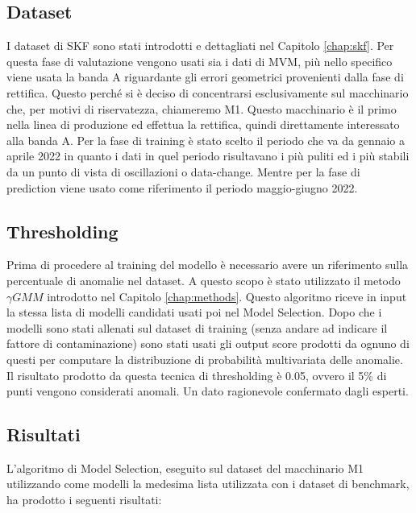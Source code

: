 \subsection{Dataset}
I dataset di SKF sono stati introdotti e dettagliati nel Capitolo \ref{chap:skf}. Per questa fase di valutazione vengono usati sia i dati di MVM, più nello specifico viene usata la banda A riguardante gli errori geometrici provenienti dalla fase di rettifica. Questo perché si è deciso di concentrarsi esclusivamente sul macchinario che, per motivi di riservatezza, chiameremo M1. Questo macchinario è il primo nella linea di produzione ed effettua la rettifica, quindi direttamente interessato alla banda A.
Per la fase di training è stato scelto il periodo che va da gennaio a aprile 2022 in quanto i dati in quel periodo risultavano i più puliti ed i più stabili da un punto di vista di oscillazioni o data-change. Mentre per la fase di prediction viene usato come riferimento il periodo maggio-giugno 2022.



\subsection{Thresholding}
Prima di procedere al training del modello è necessario avere un riferimento sulla percentuale di anomalie nel dataset. A questo scopo è stato utilizzato il metodo ${\gamma}GMM$ introdotto nel Capitolo \ref{chap:methods}.
Questo algoritmo riceve in input la stessa lista di modelli candidati usati poi nel Model Selection. Dopo che i modelli sono stati allenati sul dataset di training (senza andare ad indicare il fattore di contaminazione) sono stati usati gli output score prodotti da ognuno di questi per computare la distribuzione di probabilità multivariata delle anomalie.
Il risultato prodotto da questa tecnica di thresholding è 0.05, ovvero il 5\% di punti vengono considerati anomali. Un dato ragionevole confermato dagli esperti.


\subsection{Risultati}
L'algoritmo di Model Selection, eseguito sul dataset del macchinario M1 utilizzando come modelli la medesima lista utilizzata con i dataset di benchmark, ha prodotto i seguenti risultati:


